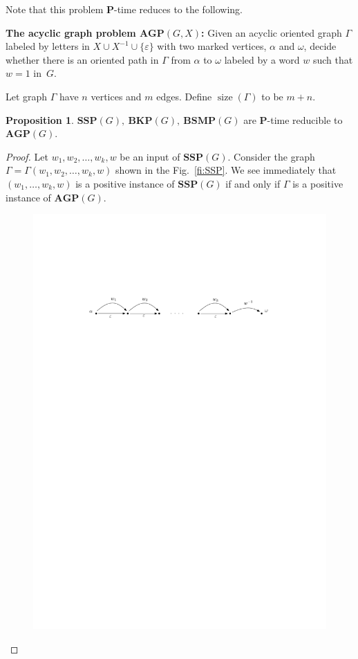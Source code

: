 \documentclass[10pt]{amsart}
\theoremstyle{definition}
\newtheorem{proposition}[theorem]{Proposition}
\DeclareMathOperator{\size}{{size}}
\def\P{{\mathbf{P}}}
\def\SSP{{\mathbf{SSP}}}
\def\BSMP{{\mathbf{BSMP}}}
\def\BKP{{\mathbf{BKP}}}
\def\AGP{{\mathbf{AGP}}}
\begin{document}
\medskip
Note that this problem $\P$-time reduces to the following.

\medskip
\noindent
{\bf The acyclic graph problem $\AGP(G,X)$\index{$\AGP(G,X)$}:}
Given an acyclic oriented graph $\Gamma$ labeled by letters in $X\cup X^{-1}\cup \{\varepsilon\}$ with two marked vertices, $\alpha$ and $\omega$, decide whether there is an oriented path in $\Gamma$ from $\alpha$ to $\omega$ labeled by a word $w$ such that $w=1$ in~$G$.

\medskip
Let graph $\Gamma$ have $n$ vertices and $m$ edges. Define $\size(\Gamma)$ to be $m+n$.  
\begin{proposition}\label{pr:reduction_to_agp}
$\SSP(G),\ \BKP(G),\ \BSMP(G)$ are $\P$-time reducible to $\AGP(G)$.
\end{proposition}
\begin{proof} Let $w_1,w_2,\ldots, w_k, w$ be an input of $\SSP(G)$. Consider the graph $\Gamma=\Gamma(w_1,w_2,\ldots,w_k,w)$ shown in the Fig.~\ref{fi:SSP}. We see immediately that $(w_1,\ldots,w_k,w)$ is a positive instance of $\SSP(G)$ if and only if $\Gamma$ is a positive instance of $\AGP(G)$.
\begin{figure}[h]
 \centering
 \includegraphics[width=4.5in]{ssp.pdf}

\end{figure}
\end{proof}
\end{document}
